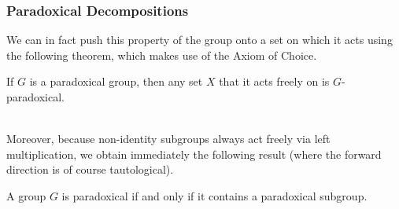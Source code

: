 \documentclass{beamer}
\begin{document}
\begin{frame}
\frametitle{Paradoxical Decompositions}
We can in fact push this property of the group onto a set on which it acts using the following theorem, which makes use of the Axiom of Choice.\\[0.5\baselineskip]

\begin{theorem}
If $G$ is a paradoxical group, then any set $X$ that it acts freely on is $G$-paradoxical. %
\end{theorem}
\noindent\\[0.5\baselineskip] Moreover, because non-identity subgroups always act freely via left multiplication, we obtain immediately the following result (where the forward direction is of course tautological).\\[0.5\baselineskip]
\begin{corollary}
A group $G$ is paradoxical if and only if it contains a paradoxical subgroup.
\end{corollary}
\noindent\\[0.5\baselineskip] %

\end{frame}
\end{document}

